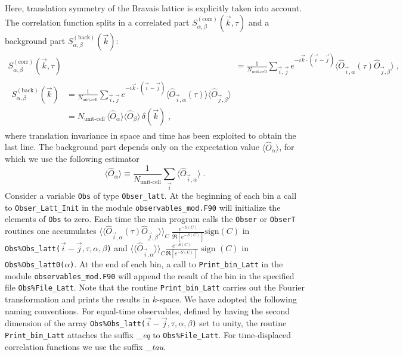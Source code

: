 %
Here,  translation symmetry of the Bravais lattice is explicitly taken into account. 
The correlation function splits in a correlated part $S_{\alpha,\beta}^{\mathrm{(corr)}}(\vec{k},\tau)$ and a background part $S_{\alpha,\beta}^{\mathrm{(back)}}(\vec{k})$:
\begin{align}
S_{\alpha,\beta}^{\mathrm{(corr)}}(\vec{k},\tau)
&=
\frac{1}{N_{\text{unit-cell}}} \sum_{\vec{i},\vec{j}}  e^{- i\vec{k} \cdot \left( \vec{i}-\vec{j}\right) }  \langle \hat{O}_{\vec{i},\alpha} (\tau) \hat{O}_{\vec{j},\beta} \rangle \label{eqn:s_corr} \;,\\
\begin{split}
S_{\alpha,\beta}^{\mathrm{(back)}}(\vec{k})
&=
\frac{1}{N_{\text{unit-cell}}} \sum_{\vec{i},\vec{j}}  e^{- i\vec{k} \cdot \left( \vec{i}-\vec{j}\right) }  \langle \hat{O}_{\vec{i},\alpha} (\tau)\rangle \langle \hat{O}_{\vec{j},\beta} \rangle\\
&=
N_{\text{unit-cell}}\, \langle \hat{O}_{\alpha} \rangle \langle \hat{O}_{\beta} \rangle \, \delta(\vec{k}) \label{eqn:s_back}\;,
\end{split}
\end{align}
where translation invariance in space and time has been exploited to obtain the last line. 
The background part depends only on the expectation value $\langle \hat{O}_{\alpha} \rangle$, for which we use the following estimator 
\begin{equation}\label{eqn:o}
\langle \hat{O}_{\alpha} \rangle \equiv \frac{1}{N_{\text{unit-cell}}} \sum\limits_{\vec{i}} \langle \hat{O}_{\vec{i},\alpha} \rangle\;.
\end{equation}
Consider a variable  \texttt{Obs} of type  \texttt{Obser\_latt}. At the beginning of each bin a call to  \texttt{Obser\_Latt\_Init} in the module \texttt{observables\_mod.F90}  will  initialize  the elements of \texttt{Obs} to zero.    Each time the main program calls the   \texttt{Obser} or  \texttt{ObserT} routines one accumulates $ \langle \langle \hat{O}_{\vec{i},\alpha} (\tau) \hat{O}_{\vec{j},\beta} \rangle \rangle_{C} \; \frac{e^{-S(C)}} {\Re \left[e^{-S(C)} \right]}  \text{sign}(C) $    in  \texttt{Obs\%Obs\_latt($\vec{i}-\vec{j},\tau,\alpha,\beta$)}   
and $ \langle \langle \hat{O}_{\vec{i},\alpha} \rangle \rangle_{C}\frac{e^{-S(C)}} {\Re \left[e^{-S(C)} \right]}  \text{ sign }(C) $  in \texttt{Obs\%Obs\_latt0($\alpha$)}.   At the end of each bin, a call to \texttt{Print\_bin\_Latt} in the module  \texttt{observables\_mod.F90}   will append the result of the bin in the specified  file \texttt{Obs\%File\_Latt}.   Note that the routine  \texttt{Print\_bin\_Latt}  carries out the Fourier transformation and prints the results in $k$-space. 
We have adopted the following naming conventions.
For equal-time observables, defined by having the second dimension of the array  \texttt{Obs\%Obs\_latt($\vec{i}-\vec{j},\tau,\alpha,\beta$)}   set to unity, 
the routine \texttt{Print\_bin\_Latt}  attaches the suffix \emph{\_eq} to \texttt{Obs\%File\_Latt}.  For time-displaced correlation functions we use the suffix \emph{\_tau}.


